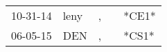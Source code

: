 \begin{supertabular}{lllll}
 10-31-14 &  leny &  , &   &  *CE1* \\
 06-05-15 &   DEN &  , &   &  *CS1* \\
\end{supertabular}
